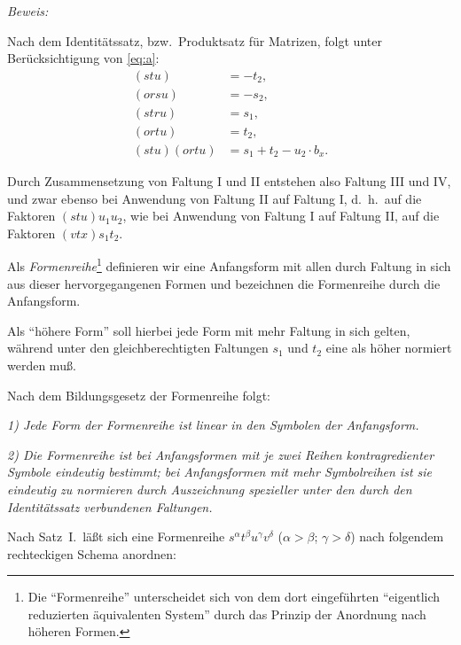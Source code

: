 \documentclass[11pt,a4paper]{article}
\theoremstyle{plain}
\theoremstyle{definition}
\begin{document}
\textit{Beweis:}

Nach dem Identit\"atssatz, bzw.~Produktsatz f\"ur Matrizen, folgt unter Ber\"ucksichtigung von \eqref{eq:a}:
\begin{align*}
(stu) &= -t_2, \\
(orsu) &= -s_2, \\
(stru) &= s_1, \\
(ortu) &= t_2, \\
(stu)(ortu) &= s_1 + t_2 - u_2 \cdot b_x.
\end{align*}

Durch Zusammensetzung von Faltung I und II entstehen also Faltung III und IV, und zwar ebenso bei Anwendung von Faltung II auf Faltung I, d.~h.~auf die Faktoren $(stu)u_1 u_2$, wie bei Anwendung von Faltung I auf Faltung II, auf die Faktoren $(vtx)s_1 t_2$.

Als \textit{Formenreihe}\footnote{Die ``Formenreihe'' unterscheidet sich von dem dort eingef\"uhrten ``eigentlich reduzierten \"aquivalenten System'' durch das Prinzip der Anordnung nach h\"oheren Formen.} definieren wir eine Anfangsform mit allen durch Faltung in sich aus dieser hervorgegangenen Formen und bezeichnen die Formenreihe durch die Anfangsform.

Als ``h\"ohere Form'' soll hierbei jede Form mit mehr Faltung in sich gelten, w\"ahrend unter den gleichberechtigten Faltungen $s_1$ und $t_2$ eine als h\"oher normiert werden mu\ss.

Nach dem Bildungsgesetz der Formenreihe folgt:

\textit{1) Jede Form der Formenreihe ist linear in den Symbolen der Anfangsform.}

\textit{2) Die Formenreihe ist bei Anfangsformen mit je zwei Reihen kontragredienter Symbole eindeutig bestimmt; bei Anfangsformen mit mehr Symbolreihen ist sie eindeutig zu normieren durch Auszeichnung spezieller unter den durch den Identit\"atssatz verbundenen Faltungen.}

Nach Satz~I.~l\"a\ss t sich eine Formenreihe $s^\alpha t^\beta u^\gamma v^\delta$ ($\alpha > \beta$; $\gamma > \delta$) nach folgendem rechteckigen Schema anordnen:

\begin{center}
\end{center}
\end{document}
